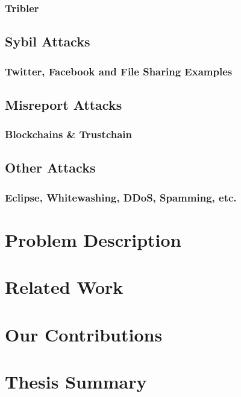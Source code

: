 \subsubsection{Tribler}
\label{subsubsec:Tribler}


\subsection{Sybil Attacks}
\label{subsec:Sybil Attacks}

\subsubsection{Twitter, Facebook and File Sharing Examples}
\label{subsubsec:Twitter, Facebook and File Sharing Examples}


\subsection{Misreport Attacks}
\label{subsec:Misreport Attacks}

\subsubsection{Blockchains \& Trustchain}
\label{Blockchains & Trustchain}


\subsection{Other Attacks}
\label{subsec:Other Attacks}

\subsubsection{Eclipse, Whitewashing, DDoS, Spamming, etc.}
\label{subsubsec:Eclipse, Whitewashing, DDoS, Spamming, etc.}



\section{Problem Description}
\label{sec:Problem Description}



\section{Related Work}
\label{sec:Related Work}



\section{Our Contributions}
\label{sec:Our Contributions}



\section{Thesis Summary}
\label{sec:Thesis Summary}





